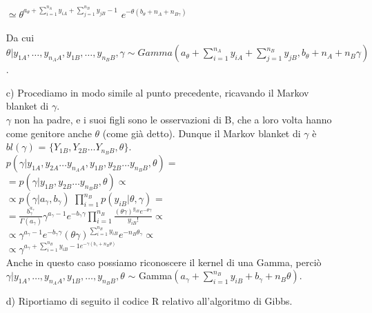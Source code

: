 \begin{enumerate}
$\simeq \theta^{a_\theta + \sum_{i=1}^{n_A}{y_{iA}} + \sum_{j=1}^{n_B}{y_{jB}-1}}$ $ e^{-\theta(b_\theta+n_A+n_{B\gamma})}$

Da cui\\
$\theta|y_{1A},\ldots,y_{n_AA},y_{1B},\ldots,y_{n_BB}, \gamma \sim Gamma(a_\theta + \sum_{i=1}^{n_A}y_{iA} + \sum_{j=1}^{n_B}y_{jB}, b_\theta + n_A + n_{B}\gamma) $.\\


\item [c)]
Procediamo in modo simile al punto precedente, ricavando il Markov blanket di $\gamma$. \\ 
$\gamma$ non ha padre, e i suoi figli sono le osservazioni di B, che a loro volta hanno come genitore anche $\theta$ (come già detto). 
Dunque  il Markov blanket di $\gamma$ è $bl(\gamma)$ = $\lbrace  Y_{1B}, Y_{2B} \ldots Y_{n_BB}, \theta\rbrace$.\\


$p(\gamma|y_{1A}, y_{2A} \ldots y_{n_AA}, y_{1B}, y_{2B} \ldots y_{n_BB}, \theta) = $\\

$= p(\gamma|y_{1B}, y_{2B} \ldots y_{n_BB}, \theta) \propto $\\

$\propto p(\gamma|a_\gamma, b_\gamma)$ $\prod_{i=1}^{n_B}{p(y_{iB}|\theta,\gamma)} $ = \\

$= \frac{b_\gamma^{a_\gamma}}{\Gamma(a_\gamma)} \gamma^{a_\gamma-1}e^{-b_\gamma\gamma} \prod_{i=1}^{n_B}{\frac{(\theta\gamma)^{y_{iB}}e^{-\theta\gamma}}{y_{iB}!}} \propto $ \\

$\propto \gamma^{a_\gamma-1}e^{-b_\gamma\gamma}(\theta\gamma)^{\sum_{i=1}^{n_B}{y_{iB}}}e^{-n_B\theta_\gamma} \propto $ \\

$ \propto\gamma^{a_\gamma + \sum_{i=1}^{n_B}{y_{iB}-1} e^{-\gamma(b_\gamma+n_B\theta)}}$\\

Anche in questo caso possiamo riconoscere il kernel di una Gamma, perciò\\

$\gamma|y_{1A},\ldots,y_{n_AA},y_{1B},\ldots,y_{n_BB},\theta$ $\sim$ Gamma$(a_\gamma + \sum_{i=1}^{n_B}y_{iB} + b_\gamma + n_{B}\theta)$.\\

 
\item [d)] Riportiamo di seguito il codice R relativo all'algoritmo di Gibbs.


\end{enumerate}
